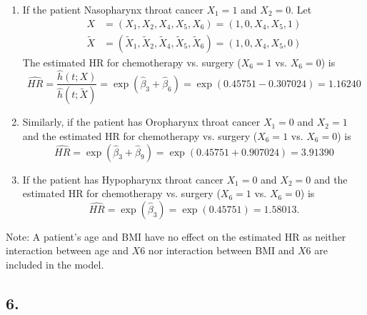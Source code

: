 \documentclass[
]{article}
\begin{document}
\begin{enumerate}
\item If the patient Nasopharynx throat cancer $X_1=1$ and $X_2=0$. Let 
\begin{align*}
X &= (X_1,X_2,X_4,X_5,X_6) = (1,0,X_4,X_5,1) \\
\tilde{X} &= (\tilde{X}_1,\tilde{X}_2,\tilde{X}_4,\tilde{X}_5,\tilde{X}_6) = (1,0,X_4,X_5,0)
\end{align*} 
The estimated HR for chemotherapy vs. surgery ($X_6=1$ vs. $X_6=0$) is
\[
\hat{HR} = \frac{\hat{h}(t;X)}{\hat{h}(t;\tilde{X})} = \exp(\hat{\beta}_3 + \hat{\beta}_6) = \exp(0.45751 -0.307024) = 1.16240
\]
\item Similarly, if the patient has Oropharynx throat cancer $X_1=0$ and $X_2=1$ and the estimated HR for chemotherapy vs. surgery ($X_6=1$ vs. $X_6=0$) is
\[
\hat{HR} = \exp(\hat{\beta}_3 + \hat{\beta}_9) = \exp(0.45751 + 0.907024) = 3.91390
\]
\item If the patient has Hypopharynx throat cancer $X_1=0$ and $X_2=0$ and the estimated HR for chemotherapy vs. surgery ($X_6=1$ vs. $X_6=0$) is
\[
\hat{HR} = \exp(\hat{\beta}_3) = \exp(0.45751) = 1.58013.
\]
\end{enumerate}

Note: A patient's age and BMI have no effect on the estimated HR as
neither interaction between age and \(X6\) nor interaction between BMI
and \(X6\) are included in the model.

\hypertarget{section-1}{%
\subsection{6.}\label{section-1}}
\end{document}
